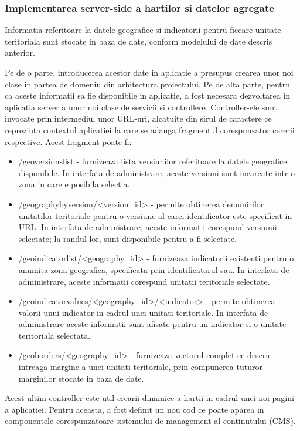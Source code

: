 \documentclass[a4paper, 10pt]{article}
\begin{document}
{\subsubsection{Implementarea server-side a hartilor si datelor agregate}

Informatia referitoare la datele geografice si indicatorii pentru fiecare unitate teritoriala sunt stocate in baza de date, conform modelului de date descris anterior. 

Pe de o parte, introducerea acestor date in aplicatie a presupus crearea unor noi clase in partea de domeniu din arhitectura proiectului. 
Pe de alta parte, pentru ca aceste informatii sa fie disponibile in aplicatie, a fost necesara dezvoltarea in aplicatia server a unor noi clase de servicii si controllere. 
Controller-ele sunt invocate prin intermediul unor URL-uri, alcatuite din sirul de caractere ce reprezinta contextul aplicatiei la care se adauga fragmentul corespunzator cererii respective. 
Acest fragment poate fi:
\begin{itemize}
\item
/geoversionslist - furnizeaza lista versiunilor referitoare la datele geografice disponibile. 
In interfata de administrare, aceste versiuni sunt incarcate intr-o zona in care e posibila selectia.
\item
/geographybyversion/<version\_id> - permite obtinerea denumirilor unitatilor teritoriale pentru o versiune al carei identificator este specificat in URL. 
In interfata de administrare, aceste informatii corespund versiunii selectate; la randul lor, sunt disponibile pentru a fi selectate. 
\item
/geoindicatorlist/<geography\_id> - furnizeaza indicatorii existenti pentru o anumita zona geografica, specificata prin identificatorul sau. 
In interfata de administrare, aceste informatii corespund unitatii teritoriale selectate.
\item
/geoindicatorvalues/<geography\_id>/<indicator> - permite obtinerea valorii unui indicator in cadrul unei unitati teritoriale. 
In interfata de administrare aceste informatii sunt afisate pentru un indicator si o unitate teritoriala selectata.
\item
/geoborders/<geography\_id> - furnizeaza vectorul complet ce descrie intreaga margine a unei unitati teritoriale, prin compunerea tuturor marginilor stocate in baza de date. 
\end{itemize}
Acest ultim controller este util crearii dinamice a hartii in cadrul unei noi pagini a aplicatiei. 
Pentru aceasta, a fost definit un nou cod ce poate aparea in componentele corespunzatoare sistemului de management al continutului (CMS). 

}
\end{document}
